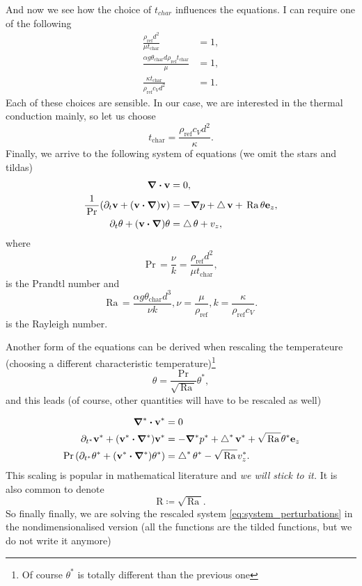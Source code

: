 \documentclass[../main.tex]{subfiles}
\begin{document}
And now we see how the choice of $t_{char}$ influences the equations. I can require one of the following
\begin{align*}
		\frac{\rho_{\text{ref}}d^{2}}{\mu t_{\text{char}}} &= 1,\\
		\frac{\alpha g \theta_{\text{char}}d \rho_{\text{ref}}t_{\text{char}}}{\mu} &= 1,\\
		\frac{\kappa t_{\text{char}}}{\rho_{\text{ref}}c_Vd^{2}} &=1.
\end{align*}
Each of these choices are sensible. In our case, we are interested in the thermal conduction mainly, so let us choose
\[
	t_{\text{char}} = \frac{\rho_{\text{ref}}c_V d^{2}}{\kappa}.
\]
Finally, we arrive to the following system of equations (we omit the stars and tildas)
\begin{align*}
	\divergence{\vb{v}} &= 0, \\
	\frac{1}{\, \text{Pr} \,}\qty(\partial_t \vb{v}+\qty(\vb{v} \vdot \grad)\vb{v}) &= - \grad p + \laplace \vb{v} + \, \text{Ra} \,\theta \vb{e}_z, \\
	\partial_t \theta + \qty(\vb{v} \vdot \grad)\theta &=  \laplace \theta + v_z,
\end{align*}
where
\begin{equation}
\label{eq:prandtl_number}
	\, \text{Pr} \, = \frac{\nu}{k} = \frac{\rho_{\text{ref}} d^{2}}{\mu t_{\text{char}}},
\end{equation}
is the Prandtl number and
\begin{equation}
\label{eq:rayleigh_number}
	\, \text{Ra} \, = \frac{\alpha g \theta_{\text{char}}d^{3}}{\nu k}, \nu = \frac{\mu}{\rho_{\text{ref}}}, k = \frac{\kappa}{\rho_{\text{ref}}c_V}.
\end{equation}
is the Rayleigh number.


Another form of the equations can be derived when rescaling the temperateure (choosing a different characteristic temperature)\footnote{Of course $\theta^{*}$ is totally different than the previous one}
\begin{equation}
	\label{eq:another_temp_scaling}
	\theta = \frac{\, \text{Pr} \,}{\sqrt{\, \text{Ra} \,}}\theta^{*},
\end{equation}
and this leads (of course, other quantities will have to be rescaled as well)

\begin{align*}
	 \grad^{*} \vdot \vb{v}^{*}&= 0 \\
	\partial_{t^{*}} \vb{v}^{*} + \qty(\vb{v}^{*} \vdot \grad^{*})\vb{v}^{*} &= - \grad^{*} p^{*} + \laplace^{*} \vb{v}^{*} + \sqrt{\, \text{Ra} \,}\theta^{*} \vb{e}_z \\
	\, \text{Pr} \,\qty(\partial_{t^{*}}\theta^{*} + \qty(\vb{v}^{*} \vdot \grad^{*})\theta^{*}) &= \laplace^{*} \theta^{*} - \sqrt{\, \text{Ra} \,}v^{*}_z.
\end{align*}
This scaling is popular in mathematical literature and \textit{we will stick to it.} It is also common to denote
\[
	\text{R} \coloneq \sqrt{\, \text{Ra} \,}.
\]
So finally finally, we are solving the rescaled system \ref{eq:system_perturbations} in the nondimensionalised version (all the functions are the tilded functions, but we do not write it anymore)
\end{document}

